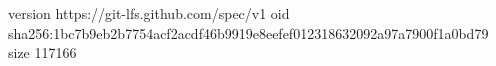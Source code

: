 version https://git-lfs.github.com/spec/v1
oid sha256:1bc7b9eb2b7754acf2acdf46b9919e8eefef012318632092a97a7900f1a0bd79
size 117166
